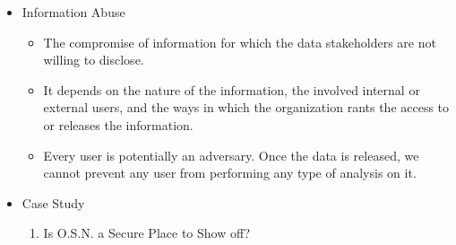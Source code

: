 \documentclass{tikzposter} %
\begin{document}
\begin{columns}
{%
	\begin{itemize}
		\item
		{Information Abuse}
 			 \begin{itemize}
   				 \item The compromise of information for which the data stakeholders are not willing to disclose.
				 \item It depends on the nature of the information, the involved internal or external users, and the ways in which the organization rants the access to or releases the information.
				 \item Every user is potentially an adversary. Once the data is released, we cannot prevent any user from performing any type of analysis on it.
  			\end{itemize}
	
\vspace{.2cm}

\item
Case Study

\begin{enumerate}
	\item
  	Is O.S.N. a Secure Place to Show off?
	\vspace{.1cm}
	

\end{enumerate}
\end{itemize}}
\end{columns}
\end{document}
